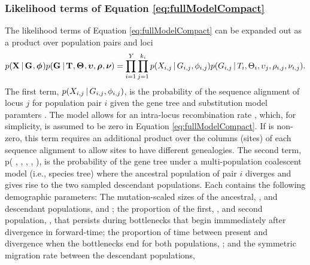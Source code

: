 \documentclass[letterpaper,12pt]{article}
\begin{document}
\begin{linenumbers}
\subsubsection*{Likelihood terms of Equation \ref{eq:fullModelCompact}}
\begin{linenomath}
The likelihood terms of Equation \ref{eq:fullModelCompact} can
be expanded out as a product over population pairs and loci
\begin{equation}
    p(\alignmentVector \given \geneTreeVector, \hkyModelVector)
    p(\geneTreeVector \given \divTimeMapVector, \demographicParamVector,
    \locusMutationRateScalarVector, \ploidyScalarVector,
    \mutationRateScalarConstantVector) = 
    \prod_{i=1}^{\npairs{}}
    \prod_{j=1}^{\nloci{i}}
    p(\alignment{i}{j} \given \geneTree{i}{j}, \hkyModel{i}{j})
    p(\geneTree{i}{j} \given \divTimeMap{i}, \demographicParams{i},
    \locusMutationRateScalar{j}, \ploidyScalar{i}{j},
    \mutationRateScalarConstant{i}{j}).
    \label{eq:modelLikelihoodExpanded}
\end{equation}
The first term,
$p(\alignment{i}{j} \given \geneTree{i}{j}, \hkyModel{i}{j})$,
is the probability of the sequence alignment of locus $j$ for population pair
$i$ given the gene tree and \hky substitution model paramters \citep[i.e., the
``Felsenstein likelhood'';][]{Felsenstein1981}.
The model allows for an intra-locus recombination rate \recombinationRate,
which, for simplicity, is assumed to be zero in Equation
\ref{eq:fullModelCompact}.
If \recombinationRate is non-zero, this term requires an additional product
over the columns (sites) of each sequence alignment to allow sites to have
different genealogies.
The second term,
p( \given {}, ,
, ,
),
is the probability of the gene tree under a multi-population coalescent model
(i.e., species tree) where the ancestral population of pair $i$ diverges
and gives rise to the two sampled descendant populations.
Each \demographicParams contains the following demographic parameters:
The mutation-scaled sizes of the ancestral, \ancestralTheta{}, and descendant
populations,  and ;
the proportion of the first, , and second population,
, that persists during bottlenecks that begin immmediately
after divergence in forward-time;
the proportion of time between present and divergence when the bottlenecks
end for both populations, \bottleTime{};
and the symmetric migration rate between the descendant populations,

\end{linenomath}
\end{linenumbers}
\end{document}
